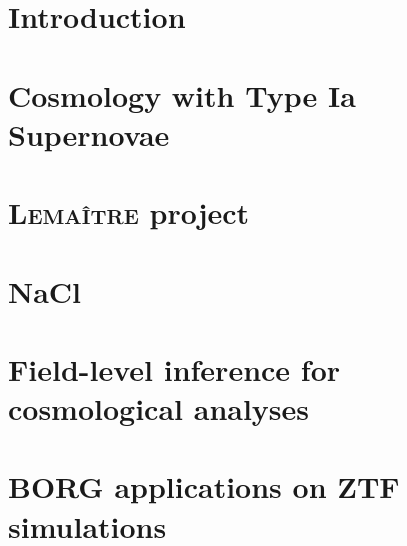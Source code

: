 \documentclass[11pt]{memoir}
\begin{document}
\dominitoc  
\setcounter{secnumdepth}{3}
\thispagestyle{empty}


\tableofcontents
\adjustmtc

\chapter{Introduction}\label{chap1}
\minitoc 






\chapter{Cosmology with Type Ia Supernovae}\label{chap2}
\minitoc 






\chapter{\textsc{Lemaître} project}\label{chap3}
\minitoc 




%


\chapter{NaCl}\label{chap4}
\minitoc 
%



%




\chapter{Field-level inference for cosmological analyses}\label{chap5}
\minitoc 





\chapter{BORG applications on ZTF simulations}\label{chap6}
\minitoc 



%
%
%
\end{document}
